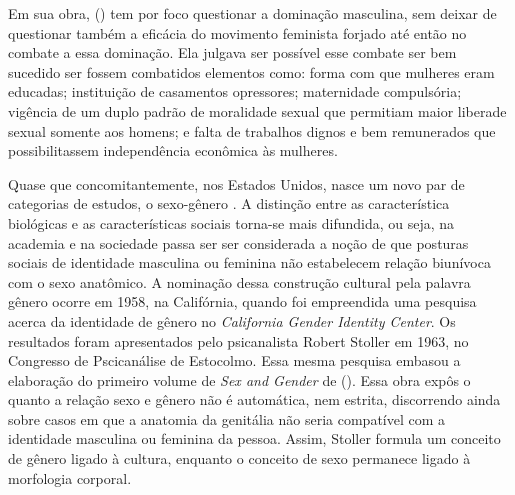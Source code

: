 Em sua obra,  (\citeyear{BEAUVOIR1967}) tem por foco questionar a dominação masculina, sem deixar de questionar também a eficácia do movimento feminista forjado até então no combate a essa dominação. Ela julgava ser possível esse combate ser bem sucedido ser fossem combatidos elementos como: forma com que mulheres eram educadas; instituição de casamentos opressores; maternidade compulsória; vigência de um duplo padrão de moralidade sexual que permitiam maior liberade sexual somente aos homens; e falta de trabalhos dignos e bem remunerados que possibilitassem independência econômica às mulheres. 

Quase que concomitantemente, nos Estados Unidos, nasce um novo par de categorias de estudos, o sexo-gênero \cite{FRAISSE2001,STOLKE2004,HARAWAY2004}. A distinção entre as característica biológicas e as características sociais torna-se mais difundida, ou seja, na academia e na sociedade passa ser ser considerada a noção de que posturas sociais de identidade masculina ou feminina não estabelecem relação biunívoca com o sexo anatômico.
A nominação dessa construção cultural pela palavra gênero ocorre em 1958, na Califórnia, quando foi empreendida uma pesquisa acerca da identidade de gênero no \emph{California Gender Identity Center}. Os resultados foram apresentados pelo psicanalista Robert Stoller em 1963, no Congresso de Pscicanálise de Estocolmo. Essa mesma pesquisa embasou a elaboração do primeiro volume de \emph{Sex and Gender} de  (\citeyear{STOLLER1968}). Essa obra expôs o quanto a relação sexo e gênero não é automática, nem estrita, discorrendo ainda sobre casos em que a anatomia da genitália não seria compatível com a identidade masculina ou feminina da pessoa. Assim, Stoller formula um conceito de gênero ligado à cultura, enquanto o conceito de sexo permanece ligado à morfologia corporal.


